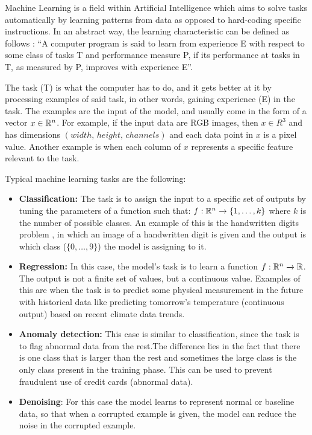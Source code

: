 Machine Learning is a field within Artificial Intelligence which aims to solve tasks automatically by learning patterns from data as opposed to hard-coding specific instructions. In an abstract way, the learning characteristic can be defined as follows \cite{Mitchell}: “A computer program is said to learn from experience E with respect to some class of tasks T and performance measure P, if its performance at tasks in T, as measured by P, improves with experience E”.

 The task (T) is what the computer has to do, and it gets better at it by processing examples of said task, in other words, gaining experience (E) in the task. The examples are the input of the model, and usually come in the form of a vector $x \in \mathbb{R}^n$. For example, if the input data are RGB images, then $x \in R^3$ and has dimensions $(width,\hspace{2pt} height, \hspace{2pt} channels)$ and each data point in $x$ is a pixel value. Another example is when each column of $x$ represents a specific feature relevant to the task.

Typical machine learning tasks are the following:
\begin{itemize}
    \item \textbf{Classification:} The task is to assign the input to a specific set of outputs by tuning the parameters of a function such that: $f: \mathbb{R}^n \xrightarrow{} \{1,\ldots, k\}$ where $k$ is the number of possible classes. An example of this is the handwritten digits problem \cite{MNIST}, in which an image of a handwritten digit is given and the output is which class ($\{0,\ldots,9\}$) the model is assigning to it. 
    \item \textbf{Regression:} In this case, the model's task is to learn a function $f: \mathbb{R}^n\xrightarrow{}\mathbb{R}$. The output is not a finite set of values, but a continuous value. Examples of this are when the task is to predict some physical measurement in the future with historical data like predicting tomorrow's temperature (continuous output) based on recent climate data trends.
    \item \textbf{Anomaly detection:} This case is similar to classification, since the task is to flag abnormal data from the rest.The difference lies in the fact that there is one class that is larger than the rest and sometimes the large class is the only class present in the training phase. This can be used to prevent fraudulent use of credit cards (abnormal data). 
    \item \textbf{Denoising}: For this case the model learns to represent normal or baseline data, so that when a corrupted example is given, the model can reduce the noise in the corrupted example.
\end{itemize}

